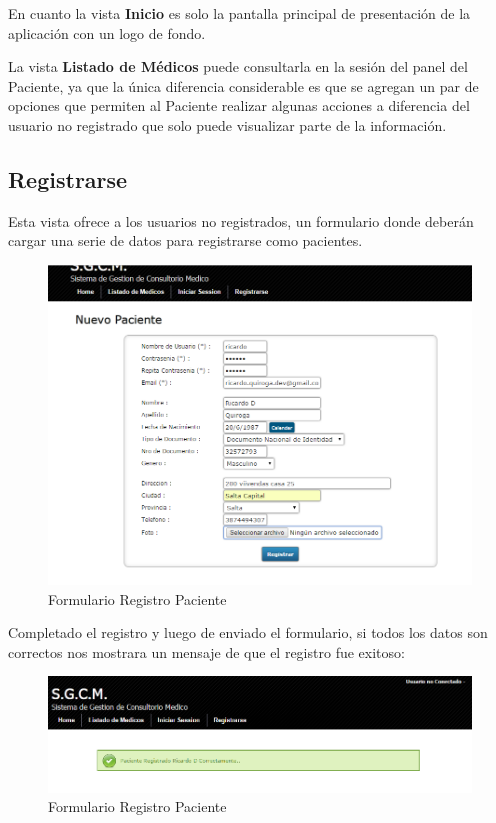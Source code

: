 En cuanto la vista \textbf{Inicio} es solo la pantalla principal de presentación de la aplicación con un logo de fondo.

La vista \textbf{Listado de Médicos} puede consultarla en la sesión del panel del Paciente, ya que la única diferencia considerable es que se agregan un par de opciones que permiten al Paciente realizar algunas acciones a diferencia del usuario no registrado que solo puede visualizar parte de la información.


\subsection{Registrarse}

Esta vista ofrece a los usuarios no registrados, un formulario donde deberán cargar una serie de datos para registrarse como pacientes.

\begin{figure}[H]
    \centering
    \includegraphics[scale=0.5]{resourse/registrar-paciente.png}
    \caption{Formulario Registro Paciente}
    \label{fig:62}
\end{figure}

Completado el registro y luego de enviado el formulario, si todos los datos son correctos nos mostrara un mensaje de que el registro fue exitoso:

\begin{figure}[H]
    \centering
    \includegraphics[scale=0.5]{resourse/registro-exito.png}
    \caption{Formulario Registro Paciente}
    \label{fig:63}
\end{figure}

